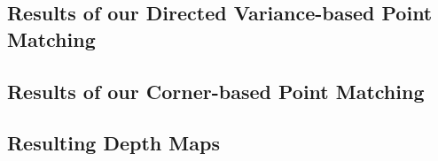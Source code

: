 \subsection{Results of our Directed Variance-based Point Matching}

\subsection{Results of our Corner-based Point Matching}



\subsection{Resulting Depth Maps}